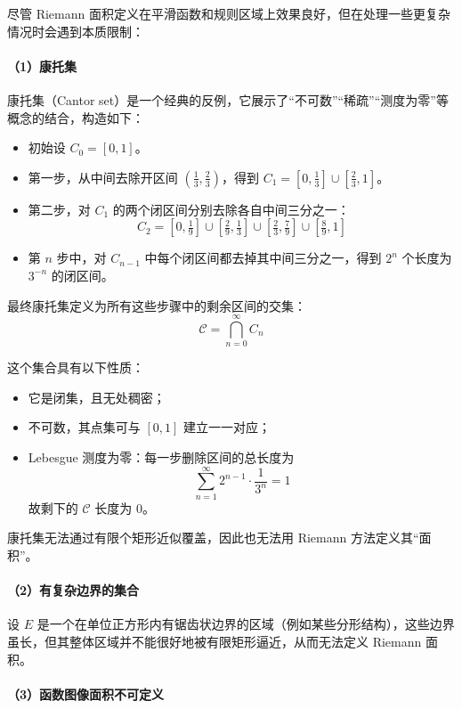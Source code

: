 \documentclass[a4paper, oneside]{article}
\begin{document}
尽管 Riemann 面积定义在平滑函数和规则区域上效果良好，但在处理一些更复杂情况时会遇到本质限制：

\paragraph{（1）康托集}

康托集（Cantor set）是一个经典的反例，它展示了“不可数”“稀疏”“测度为零”等概念的结合，构造如下：

\begin{itemize}
    \item 初始设 $C_0 = [0,1]$。
    \item 第一步，从中间去除开区间 $(\tfrac{1}{3}, \tfrac{2}{3})$，得到 $C_1 = [0,\tfrac{1}{3}] \cup [\tfrac{2}{3},1]$。
    \item 第二步，对 $C_1$ 的两个闭区间分别去除各自中间三分之一：
    \[
    C_2 = [0,\tfrac{1}{9}] \cup [\tfrac{2}{9},\tfrac{1}{3}] \cup [\tfrac{2}{3},\tfrac{7}{9}] \cup [\tfrac{8}{9},1]
    \]
    \item 第 $n$ 步中，对 $C_{n-1}$ 中每个闭区间都去掉其中间三分之一，得到 $2^n$ 个长度为 $3^{-n}$ 的闭区间。
\end{itemize}

最终康托集定义为所有这些步骤中的剩余区间的交集：
\[
\mathcal{C} = \bigcap_{n=0}^{\infty} C_n
\]

这个集合具有以下性质：

\begin{itemize}
    \item 它是闭集，且无处稠密；
    \item 不可数，其点集可与 $[0,1]$ 建立一一对应；
    \item Lebesgue 测度为零：每一步删除区间的总长度为
    \[
    \sum_{n=1}^{\infty} 2^{n-1} \cdot \frac{1}{3^n} = 1
    \]
    故剩下的 $\mathcal{C}$ 长度为 $0$。
\end{itemize}

康托集无法通过有限个矩形近似覆盖，因此也无法用 Riemann 方法定义其“面积”。

\paragraph{（2）有复杂边界的集合}

设 $E$ 是一个在单位正方形内有锯齿状边界的区域（例如某些分形结构），这些边界虽长，但其整体区域并不能很好地被有限矩形逼近，从而无法定义 Riemann 面积。

\paragraph{（3）函数图像面积不可定义}
\end{document}
